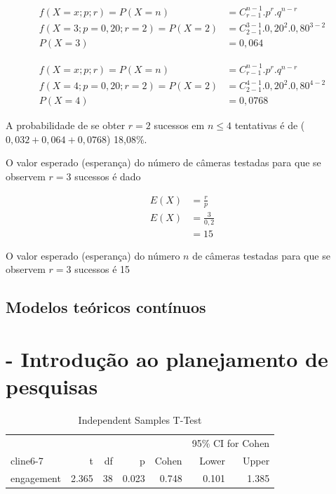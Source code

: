 \documentclass[
]{book}
\begin{document}
\hfill\break

\begin{align*}
f(X=x; p; r) = P(X=n) & = {C}_{r-1}^{n-1} . {p}^{r}. {q}^{n-r} \\
f(X=3; p=0,20 ; r=2) = P(X=2) & = {C}_{2-1}^{3-1} . {0,20}^{2}. {0,80}^{3-2} \\ 
P(X=3) & = 0,064
\end{align*}

\hfill\break

\begin{align*}
f(X=x; p; r) = P(X=n) & = {C}_{r-1}^{n-1} . {p}^{r}. {q}^{n-r} \\
f(X=4; p=0,20 ; r=2) = P(X=2) & = {C}_{2-1}^{4-1} . {0,20}^{2}. {0,80}^{4-2} \\  
P(X=4) & = 0,0768
\end{align*}

A probabilidade de se obter \(r=2\) sucessos em \(n \leq 4\) tentativas é de (\(0,032+0,064+0,0768\)) 18,08\%.

\hfill\break

O valor esperado (esperança) do número de câmeras testadas para que se observem \(r=3\) sucessos é dado

\begin{align*}
E(X) &  = \frac{r}{p} \\
E(X) & = \frac{3}{0,2} \\
     & =15
\end{align*}

O valor esperado (esperança) do número \(n\) de câmeras testadas para que se observem \(r=3\) sucessos é 15

\hypertarget{modelos-teuxf3ricos-contuxednuos}{%
\section{Modelos teóricos contínuos}\label{modelos-teuxf3ricos-contuxednuos}}

\hypertarget{planejamento_pesquisas}{%
\chapter{- Introdução ao planejamento de pesquisas}\label{planejamento_pesquisas}}

\begin{table}[h]
\centering
\caption{Independent Samples T-Test}
\label{tab:independentSamplesT-Test}
{
\begin{tabular}{lrrrrrr}
\toprule
\multicolumn{1}{c}{} & \multicolumn{1}{c}{} & \multicolumn{1}{c}{} & \multicolumn{1}{c}{} & \multicolumn{1}{c}{} & \multicolumn{2}{c}{95\% CI for Cohen} \\
cline{6-7}
& t & df & p & Cohen & Lower & Upper  \\
\cmidrule[0.4pt]{1-7}
engagement & 2.365 & 38 & 0.023 & 0.748 & 0.101 & 1.385  \\
\bottomrule
\end{tabular}
}
\end{table}
\end{document}
